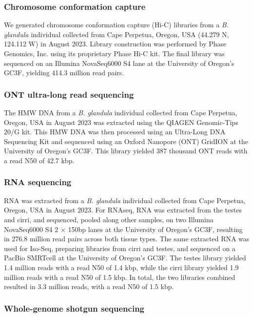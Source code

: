 \documentclass[11pt]{article}
\newcommand{\bgla}{\textit{B. glandula}\xspace}
\begin{document}
\subsubsection*{Chromosome conformation capture}

We generated chromosome conformation capture (Hi-C) libraries from a \textit{B.
glandula} individual collected from Cape Perpetua, Oregon, USA (44.279 N, 124.112
W) in August 2023. Library construction was performed by Phase Genomics, Inc.
using its proprietary Phase Hi-C kit. The final library was sequenced on an
Illumina NovaSeq6000 S4 lane at the University of Oregon's GC3F, yielding
414.3 million read pairs.

\subsubsection*{ONT ultra-long read sequencing}

The HMW DNA from a \bgla{} individual collected from Cape Perpetua,
Oregon, USA in August 2023 was extracted using the QIAGEN Genomic-Tips 20/G kit.
This HMW DNA was then processed using an Ultra-Long DNA Sequencing Kit and sequenced
using an Oxford Nanopore (ONT) GridION at the University of Oregon's GC3F. This
library yielded 387 thousand ONT reads with a read N50 of 42.7 kbp.

\subsubsection*{RNA sequencing}

RNA was extracted from a \bgla{} individual collected from Cape
Perpetua, Oregon, USA in August 2023. For RNAseq, RNA was extracted from the
testes and cirri, and sequenced, pooled along other samples, on two Illumina
NovaSeq6000 S4 2 $\times$ 150bp lanes at the University of Oregon's GC3F,
resulting in 276.8 million read pairs across both tissue types. The same
extracted RNA was used for Iso-Seq, preparing libraries from cirri and testes,
and sequenced on a PacBio SMRTcell at the University of Oregon's GC3F. The
testes library yielded 1.4 million reads with a read N50 of 1.4 kbp, while the
cirri library yielded 1.9 million reads with a read N50 of 1.5 kbp. In total,
the two libraries combined resulted in 3.3 million reads, with a read N50 of
1.5 kbp.

\subsubsection*{Whole-genome shotgun sequencing}
\end{document}
